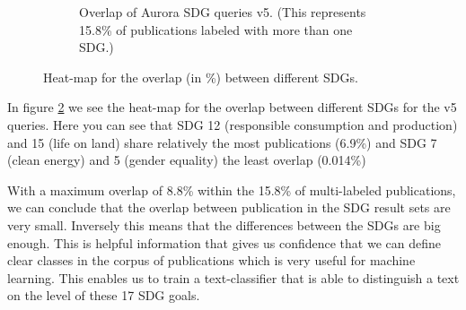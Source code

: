 \documentclass{article}
\begin{document}
\begin{figure}[H]
\begin{subfigure}{0.49\textwidth}
	    \caption{Overlap of Aurora SDG queries v5. (This represents 15.8\% of publications labeled with more than one SDG.)}
	    \label{heatmapoverlapv5}
    \end{subfigure}
    \caption{Heat-map for the overlap (in \%) between different SDGs.}
\end{figure}



In  figure \ref{heatmapoverlapv5} we see the heat-map for the overlap between different SDGs for the v5 queries. Here you can see that SDG 12 (responsible consumption and production) and 15 (life on land) share relatively the most publications (6.9\%) and SDG 7 (clean energy) and 5 (gender equality) the least overlap (0.014\%)



With a maximum overlap of 8.8\% within the 15.8\% of multi-labeled publications, we can conclude that the overlap between publication in the SDG result sets are very small. Inversely this means that the differences between the SDGs are big enough. This is helpful information that gives us confidence that we can define clear classes in the corpus of publications which is very useful for machine learning. This enables us to train a text-classifier that is able to distinguish a text on the level of these 17 SDG goals.
\end{document}
